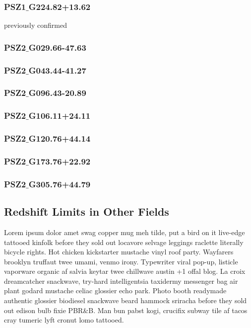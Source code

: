\documentclass[apj, revtex4]{emulateapj}
\begin{document}
\subsubsection{PSZ1$\_$G224.82+13.62}
previously confirmed

\subsubsection{PSZ2$\_$G029.66-47.63}

\subsubsection{PSZ2$\_$G043.44-41.27}

\subsubsection{PSZ2$\_$G096.43-20.89}

\subsubsection{PSZ2$\_$G106.11+24.11}

\subsubsection{PSZ2$\_$G120.76+44.14}

\subsubsection{PSZ2$\_$G173.76+22.92}

\subsubsection{PSZ2$\_$G305.76+44.79}

\subsection{Redshift Limits in Other Fields}

Lorem ipsum dolor amet swag copper mug meh tilde, put a bird on it live-edge tattooed kinfolk before they sold out locavore selvage leggings raclette literally bicycle rights. Hot chicken kickstarter mustache vinyl roof party. Wayfarers brooklyn truffaut twee umami, venmo irony. Typewriter viral pop-up, listicle vaporware organic af salvia keytar twee chillwave austin +1 offal blog. La croix dreamcatcher snackwave, try-hard intelligentsia taxidermy messenger bag air plant godard mustache celiac glossier echo park. Photo booth readymade authentic glossier biodiesel snackwave beard hammock sriracha before they sold out edison bulb fixie PBR\&B. Man bun pabst kogi, crucifix subway tile af tacos cray tumeric lyft cronut lomo tattooed.
\end{document}
